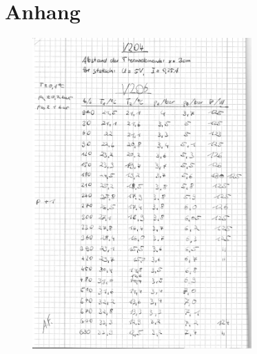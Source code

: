 \newpage
\appendix
\section{Anhang}\label{sec:anhang}
\begin{figure}[ht]
  \centering
  \includegraphics[width=0.75\textwidth]{content/originaldaten/1.jpg}
\end{figure}
